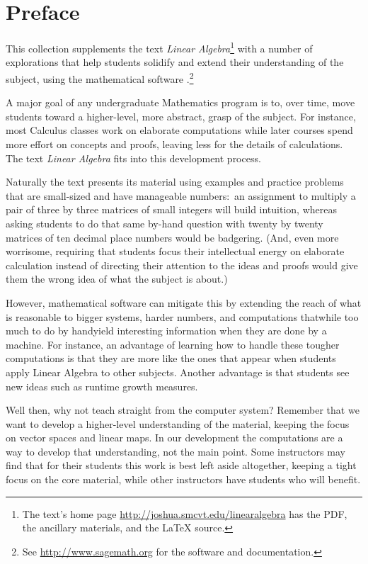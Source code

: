 \chapter*{Preface}\pagestyle{preface}\thispagestyle{preface}


This collection supplements the text \nocite{Hefferon12}
\textit{Linear Algebra}\footnote{The text's home page 
\protect\url{http://joshua.smcvt.edu/linearalgebra} 
has the PDF, the ancillary materials, and the \protect\LaTeX{} source.}
with a number of explorations that help students
solidify and extend their understanding of the subject, 
using the mathematical software \Sage{}.\footnote{See 
\url{http://www.sagemath.org} for the software and documentation.}

A major goal of any undergraduate Mathematics program is to,
over time, move students 
toward a higher-level, more abstract, grasp of the subject.
For instance, most Calculus classes work on elaborate computations
while later courses spend more effort on concepts and proofs, leaving 
less for the details of calculations.  
The text \textit{Linear Algebra} fits into
this development process.

Naturally the text presents its material 
using examples and practice problems
that are small-sized and have manageable numbers:~an 
assignment to multiply a pair of three by three matrices
of small integers will build intuition, whereas asking students to do that same 
by-hand question with twenty by twenty matrices
of ten decimal place numbers would be badgering. 
(And, even more worrisome, requiring that students  
focus their intellectual energy on elaborate calculation instead of directing
their attention to the ideas and proofs would give them the wrong idea of
what the subject is about.)

However, mathematical software can mitigate this by extending the reach of
what is reasonable
to bigger systems, harder numbers, and computations 
that\Dash while too much to do by hand\Dash yield
interesting information when they are done by a machine.
For instance, an advantage of learning how to handle these 
tougher computations is that 
they are more like the ones that appear when students apply Linear 
Algebra to other subjects.
Another advantage is that students see new ideas such as 
runtime growth measures.

Well then, why 
not teach straight from the computer system?
Remember that we want to develop a higher-level understanding of the 
material, 
keeping the focus on vector spaces and linear maps.
In our development 
the computations are a way to develop that understanding, not the main point.
Some instructors may find 
that for their students
this work is best left aside altogether, keeping a tight focus on the
core material, while other instructors
have students who will benefit.


